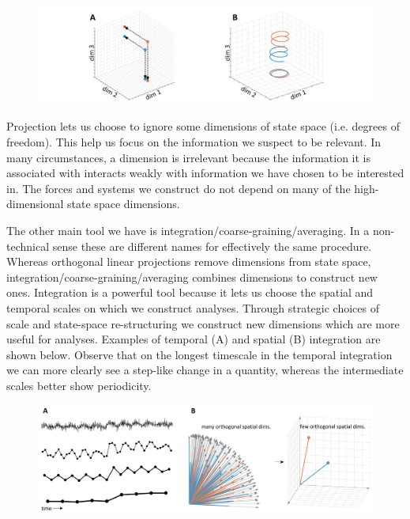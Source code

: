   
\begin{figure}
\includegraphics[width=\textwidth]{figures/Tilsen-img170.png}
\caption{\missingcaption}
\label{fig:8:4}
\end{figure}
 

  Projection lets us choose to ignore some dimensions of state space (i.e. degrees of freedom). This help us focus on the information we suspect to be relevant. In many circumstances, a dimension is irrelevant because the information it is associated with interacts weakly with information we have chosen to be interested in. The forces and systems we construct do not depend on many of the high-dimensional state space dimensions. 

  The other main tool we have is integration/coarse-graining/averaging. In a non-technical sense these are different names for effectively the same procedure. Whereas orthogonal linear projections remove dimensions from state space, integration/coarse-graining/averaging combines dimensions to construct new ones. Integration is a powerful tool because it lets us choose the spatial and temporal scales on which we construct analyses. Through strategic choices of scale and state-space re-structuring we construct new dimensions which are more useful for analyses. Examples of temporal (A) and spatial (B) integration are shown below. Observe that on the longest timescale in the temporal integration we can more clearly see a step-like change in a quantity, whereas the intermediate scales better show periodicity.

  
\begin{figure}
\includegraphics[width=\textwidth]{figures/Tilsen-img171.png}
\caption{\missingcaption}
\label{fig:8:5}
\end{figure}
 

